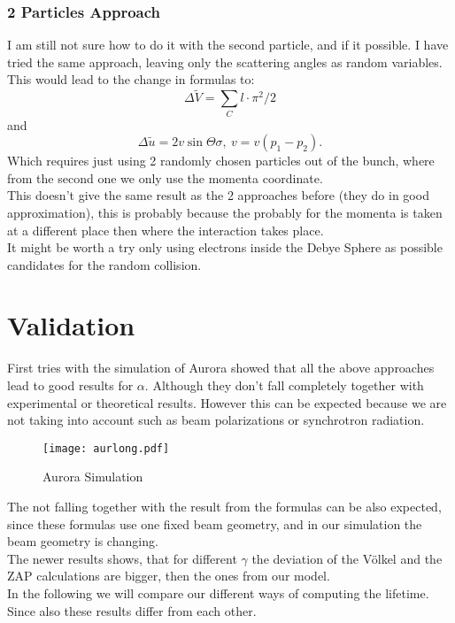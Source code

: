 \subsubsection{2 Particles Approach}
I am still not sure how to do it with the second particle, and if it possible. I have tried the same approach, leaving only the scattering angles as random variables. This would lead to the change in formulas to:
\begin{equation} \Delta \tilde V = \sum\limits_C l \cdot \pi^2 / 2 \end{equation}
and
\begin{equation} \Delta \tilde u = 2 v \sin \Theta \sigma, \ v = v(p_1 - p_2). \end{equation}
Which requires just using 2 randomly chosen particles out of the bunch, where from the second one we only use the momenta coordinate.\\
This doesn't give the same result as the 2 approaches before (they do in good approximation), this is probably because the probably for the momenta is taken at a different place then where the interaction takes place.\\
It might be worth a try only using electrons inside the Debye Sphere as possible candidates for the random collision.

\pagebreak

\section{Validation}
First tries with the simulation of Aurora showed that all the above approaches lead to good results for $\alpha$. Although they don't fall completely together with experimental or theoretical results. However this can be expected because we are not taking into account such as beam polarizations or synchrotron radiation.\\
\begin{figure}[here]
 \centering
 \texttt{[image: aurlong.pdf]}
 \caption{Aurora Simulation}
\end{figure}
The not falling together with the result from the formulas can be also expected, since these formulas use one fixed beam geometry, and in our simulation the beam geometry is changing.\\
The newer results shows, that for different $\gamma$ the deviation of the V\"olkel and the ZAP calculations are bigger, then the ones from our model.\\
In the following we will compare our different ways of computing the lifetime. Since also these results differ from each other.

